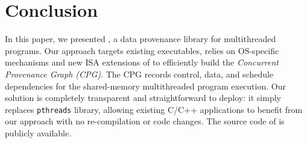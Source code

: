 \section{Conclusion}
\label{sec:conclusion}

In this paper, we presented \projecttitle, a data provenance library for multithreaded programs. Our approach targets existing executables, relies on OS-specific mechanisms and new ISA extensions of \intelpt  to efficiently build the {\em Concurrent Provenance Graph (CPG)}. The CPG records control, data, and schedule dependencies for the shared-memory multithreaded program execution. Our solution is completely transparent and straightforward to deploy: it simply replaces {\tt pthreads} library, allowing existing C/C++ applications to benefit from our approach with no re-compilation or code changes.  The source code of \projecttitle is publicly available.

